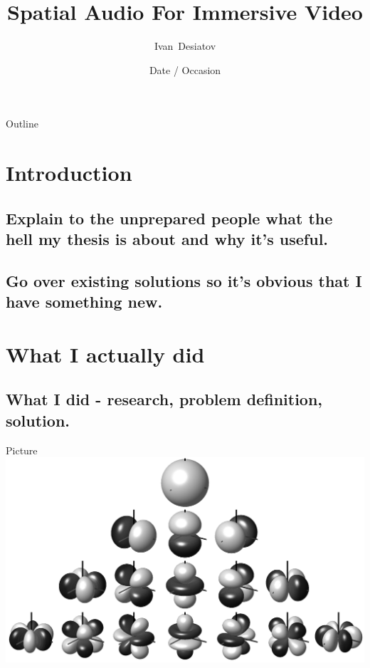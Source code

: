 \documentclass[aspectratio=169]{beamer}
\title %
{Spatial Audio For Immersive Video}
\author[Author, Another] %
{Ivan~Desiatov}
\date[Short Occasion] %
{Date / Occasion}
\begin{document}
\begin{frame}
  \titlepage
\end{frame}

\begin{frame}{Outline}
  \tableofcontents
\end{frame}


\section{Introduction}

\subsection{Explain to the unprepared people what the hell my thesis is about and why it's useful.}
\subsection{Go over existing solutions so it's obvious that I have something new.}

\section{What I actually did}

\subsection{What I did - research, problem definition, solution.}

\begin{frame}{Picture}
\includegraphics{images/spatial_audio/spherical_harmonics.png}
\end{frame}
\end{document}
